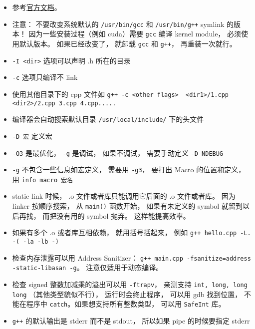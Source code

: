 
\begin{issues}
\issueDraft
\end{issues}


\begin{itemize}
\item 参考\href{https://gcc.gnu.org/onlinedocs/gcc-12.2.0/gcc/}{官方文档}。
\item 注意： 不要改变系统默认的 \verb`/usr/bin/gcc` 和 \verb`/usr/bin/g++` symlink 的版本！ 因为一些安装过程（例如 cuda）需要 \verb`gcc` 编译 kernel module， 必须使用默认版本。 如果已经改变了， 就卸载 \verb`gcc` 和 \verb`g++`， 再重装一次就行。
\item \verb`-I <dir>` 选项可以声明 .h 所在的目录
\item \verb`-c` 选项只编译不 link
\item 使用其他目录下的 cpp 文件如 \verb`g++ -c <other flags>  <dir1>/1.cpp <dir2>/2.cpp 3.cpp 4.cpp.....`
\item 编译器会自动搜索默认目录 \verb`/usr/local/include/` 下的头文件
\item \verb`-D 宏` 定义宏
\item \verb`-O3` 是最优化， \verb`-g` 是调试， 如果不调试， 需要手动定义 \verb`-D NDEBUG`
\item \verb`-g` 不包含一些信息如宏定义， 需要用 \verb`-g3`， 要打出 Macro 的位置和定义， 用 \verb`info macro 宏名`
\item static link 时候， .o 文件或者库只能调用它后面的 .o 文件或者库。 因为 linker 按顺序搜索， 从 \verb`main()` 函数开始， 如果有未定义的 symbol 就留到以后再找， 而把没有用的 symbol 抛弃。 这样能提高效率。
\item 如果有多个 .o 或者库互相依赖， 就用括号括起来， 例如 \verb`g++ hello.cpp -L. -( -la -lb -)` \ver
\item 检查内存泄露可以用 Address Sanitizer： \verb`g++ main.cpp -fsanitize=address -static-libasan -g`。 注意仅适用于动态编译。
\item 检查 signed 整数加减乘的溢出可以用 \verb`-ftrapv`， 亲测支持 \verb`int, long, long long` （其他类型貌似不行）， 运行时会终止程序， 可以用 gdb 找到位置， 不能在程序中 \verb`catch`。如果想支持所有整数类型， 可以用 \verb`SafeInt` 库。
\item \verb`g++` 的默认输出是 stderr 而不是 stdout， 所以如果 pipe 的时候要指定 stderr
\end{itemize}

